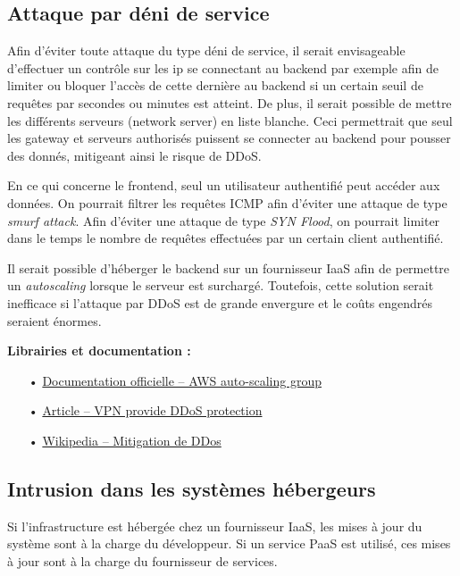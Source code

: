 \documentclass[12pt]{article}
\begin{document}
\subsection{Attaque par déni de service}
\label{ssec:cm-ddos}

Afin d'éviter toute attaque du type déni de service, il serait envisageable d'effectuer un contrôle sur les ip se connectant au backend par exemple afin de limiter ou bloquer l'accès de cette dernière au backend si un certain seuil de requêtes par secondes ou minutes est atteint. De plus, il serait possible de mettre les différents serveurs (network server) en liste blanche. Ceci permettrait que seul les gateway et serveurs authorisés puissent se connecter au backend pour pousser des donnés, mitigeant ainsi le risque de DDoS.

En ce qui concerne le frontend, seul un utilisateur authentifié peut accéder aux données. On pourrait filtrer les requêtes ICMP afin d'éviter une attaque de type \textit{smurf attack}. Afin d'éviter une attaque de type \textit{SYN Flood}, on pourrait limiter dans le temps le nombre de requêtes effectuées par un certain client authentifié.

Il serait possible d'héberger le backend sur un fournisseur IaaS afin de permettre un \textit{autoscaling} lorsque le serveur est surchargé. Toutefois, cette solution serait inefficace si l'attaque par DDoS est de grande envergure et le coûts engendrés seraient énormes.

\medskip
\textbf{Librairies et documentation :}

\begin{itemize}
\item[•] \href{https://docs.aws.amazon.com/autoscaling/ec2/userguide/AutoScalingGroup.html}{Documentation officielle -- AWS auto-scaling group}
\item[•] \href{https://vpn-services.bestreviews.net/vpn-provide-ddos-protection/}{Article -- VPN provide DDoS protection}
\item[•] \href{https://fr.wikipedia.org/wiki/Mitigation_de_DDoS}{Wikipedia -- Mitigation de DDos}
\end{itemize}

\subsection{Intrusion dans les systèmes hébergeurs}
\label{ssec:cm-intrusion}

Si l'infrastructure est hébergée chez un fournisseur IaaS, les mises à jour du système sont à la charge du développeur. Si un service PaaS est utilisé, ces mises à jour sont à la charge du fournisseur de services.
\end{document}

